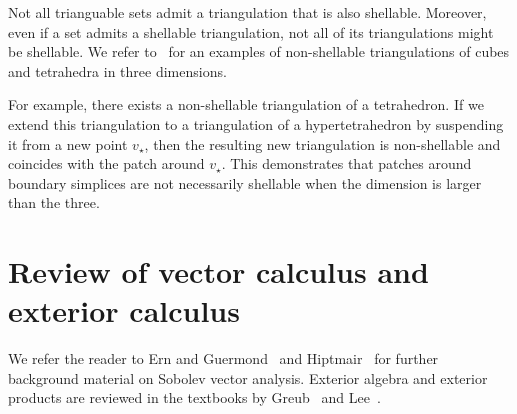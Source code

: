 \documentclass[10pt,letterpaper]{article}
\begin{document}
\begin{remark}
    Not all trianguable sets admit a triangulation that is also shellable. 
    Moreover, even if a set admits a shellable triangulation, not all of its triangulations might be shellable. 
    We refer to~\cite[Example 8.9]{ziegler2012lectures} for an examples of non-shellable triangulations of cubes and tetrahedra in three dimensions. 

    For example, there exists a non-shellable triangulation of a tetrahedron. 
    If we extend this triangulation to a triangulation of a hypertetrahedron by suspending it from a new point $v_\star$, 
    then the resulting new triangulation is non-shellable and coincides with the patch around $v_\star$.
    This demonstrates that patches around boundary simplices are not necessarily shellable when the dimension is larger than the three.
\end{remark}


 








\section{Review of vector calculus and exterior calculus}\label{section:calculus}

We refer the reader to Ern and Guermond~\cite{ern2021finite} and Hiptmair~\cite{hiptmair2002finite} for further background material on Sobolev vector analysis. 
Exterior algebra and exterior products are reviewed in the textbooks by Greub~\cite{greub1967multilinear} and Lee~\cite{lee2012smooth}.
\end{document}
